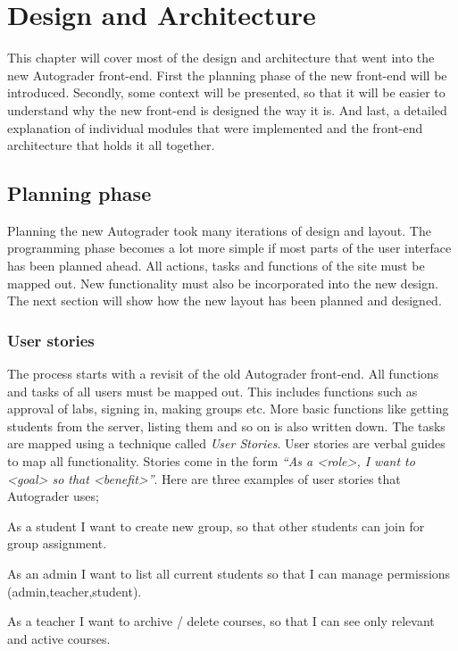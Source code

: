 \chapter{Design and Architecture}
This chapter will cover most of the design and architecture that went into the new Autograder front-end. First the planning phase of the new front-end will be introduced. Secondly, some context will be presented, so that it will be easier to understand why the new front-end is designed the way it is. And last, a detailed explanation of individual modules that were implemented and the front-end architecture that holds it all together.

\section{Planning phase}
Planning the new Autograder took many iterations of design and layout. The programming phase becomes a lot more simple if most parts of the user interface has been planned ahead. All actions, tasks and functions of the site must be mapped out. New functionality must also be incorporated into the new design. The next section will show how the new layout has been planned and designed.

\subsection{User stories}
The process starts with a revisit of the old Autograder front-end. All functions and tasks of all users must be mapped out. This includes functions such as approval of labs, signing in, making groups etc. More basic functions like getting students from the server, listing them and so on is also written down. The tasks are mapped using a technique called \emph{User Stories}. User stories are verbal guides to map all functionality. Stories come in the form \emph{``As a <role>, I want to <goal> so that <benefit>''}. Here are three examples of user stories that Autograder uses;

\begin{itemize*}
\item As a student I want to create new group, so that other students can join for group assignment.
\item As an admin I want to list all current students so that I can manage permissions (admin,teacher,student).
\item As a teacher I want to archive / delete courses, so that I can see only relevant and active courses.
\end{itemize*}

